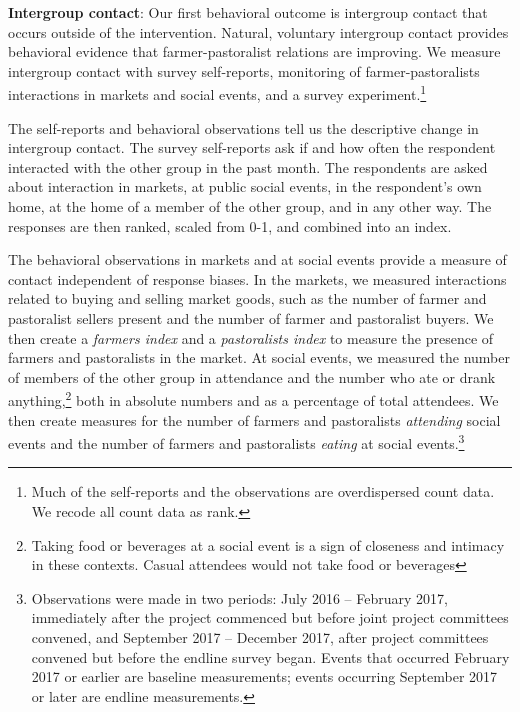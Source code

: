 \documentclass[11pt]{article}
\begin{document}
\textbf{Intergroup contact}: Our first behavioral outcome is intergroup
contact that occurs outside of the intervention. Natural, voluntary
intergroup contact provides behavioral evidence that farmer-pastoralist
relations are improving. We measure intergroup contact with survey
self-reports, monitoring of farmer-pastoralists interactions in markets
and social events, and a survey experiment.\footnote{Much of the
  self-reports and the observations are overdispersed count data. We
  recode all count data as rank.}

The self-reports and behavioral observations tell us the descriptive
change in intergroup contact. The survey self-reports ask if and how
often the respondent interacted with the other group in the past month.
The respondents are asked about interaction in markets, at public social
events, in the respondent's own home, at the home of a member of the
other group, and in any other way. The responses are then ranked, scaled
from 0-1, and combined into an index.

The behavioral observations in markets and at social events provide a
measure of contact independent of response biases. In the markets, we
measured interactions related to buying and selling market goods, such
as the number of farmer and pastoralist sellers present and the number
of farmer and pastoralist buyers. We then create a \emph{farmers index}
and a \emph{pastoralists index} to measure the presence of farmers and
pastoralists in the market. At social events, we measured the number of
members of the other group in attendance and the number who ate or drank
anything,\footnote{Taking food or beverages at a social event is a sign
  of closeness and intimacy in these contexts. Casual attendees would
  not take food or beverages} both in absolute numbers and as a
percentage of total attendees. We then create measures for the number of
farmers and pastoralists \emph{attending} social events and the number
of farmers and pastoralists \emph{eating} at social events.\footnote{Observations
  were made in two periods: July 2016 -- February 2017, immediately
  after the project commenced but before joint project committees
  convened, and September 2017 -- December 2017, after project
  committees convened but before the endline survey began. Events that
  occurred February 2017 or earlier are baseline measurements; events
  occurring September 2017 or later are endline measurements.}
\end{document}
